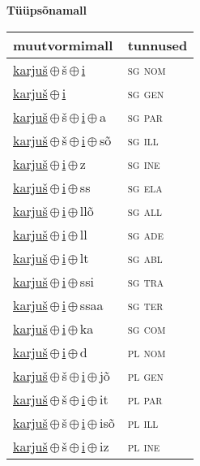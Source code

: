 

\vspace{3.5em}
\noindent \begin{minipage}{\textwidth}
\noindent \textbf{Tüüpsõnamall \,}\\

\begin{sideways}
\begin{tabular}{l l}
muutvormimall & tunnused \\
\hline
\underline{karjuš}\,$\oplus$\,š\,$\oplus$\,\underline{i} & \textsc{ sg nom } \\
\underline{karjuš}\,$\oplus$\,\underline{i} & \textsc{ sg gen } \\
\underline{karjuš}\,$\oplus$\,š\,$\oplus$\,\underline{i}\,$\oplus$\,a & \textsc{ sg par } \\
\underline{karjuš}\,$\oplus$\,š\,$\oplus$\,\underline{i}\,$\oplus$\,sõ & \textsc{ sg ill } \\
\underline{karjuš}\,$\oplus$\,\underline{i}\,$\oplus$\,z & \textsc{ sg ine } \\
\underline{karjuš}\,$\oplus$\,\underline{i}\,$\oplus$\,ss & \textsc{ sg ela } \\
\underline{karjuš}\,$\oplus$\,\underline{i}\,$\oplus$\,llõ & \textsc{ sg all } \\
\underline{karjuš}\,$\oplus$\,\underline{i}\,$\oplus$\,ll & \textsc{ sg ade } \\
\underline{karjuš}\,$\oplus$\,\underline{i}\,$\oplus$\,lt & \textsc{ sg abl } \\
\underline{karjuš}\,$\oplus$\,\underline{i}\,$\oplus$\,ssi & \textsc{ sg tra } \\
\underline{karjuš}\,$\oplus$\,\underline{i}\,$\oplus$\,ssaa & \textsc{ sg ter } \\
\underline{karjuš}\,$\oplus$\,\underline{i}\,$\oplus$\,ka & \textsc{ sg com } \\
\underline{karjuš}\,$\oplus$\,\underline{i}\,$\oplus$\,d & \textsc{ pl nom } \\
\underline{karjuš}\,$\oplus$\,š\,$\oplus$\,\underline{i}\,$\oplus$\,jõ & \textsc{ pl gen } \\
\underline{karjuš}\,$\oplus$\,š\,$\oplus$\,\underline{i}\,$\oplus$\,it & \textsc{ pl par } \\
\underline{karjuš}\,$\oplus$\,š\,$\oplus$\,\underline{i}\,$\oplus$\,isõ & \textsc{ pl ill } \\
\underline{karjuš}\,$\oplus$\,š\,$\oplus$\,\underline{i}\,$\oplus$\,iz & \textsc{ pl ine } \\

\end{tabular}
\end{sideways}
\end{minipage}
